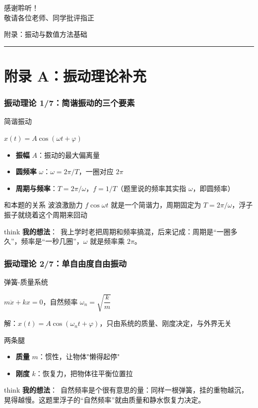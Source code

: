 \documentclass[aspectratio=169]{beamer}
\newcommand{\remark}[2]{%
	\vspace{0.12cm}%
	\begin{beamercolorbox}[rounded=true,sep=6pt]{think}%
		{\color{orchidpurple}\textbf{#1}：}~#2%
	\end{beamercolorbox}%
}
\begin{document}
\begin{frame}
	\centering
	\Huge{感谢聆听！}\\[1cm]
	\Large{敬请各位老师、同学批评指正}
\end{frame}

\appendix

\begin{frame}
	\centering
	\vspace{1.5cm}
	{\color{orchiddark}附录：振动与数值方法基础}\\
	\vspace{0.5cm}
	{\color{orchidpurple}\rule{0.35\textwidth}{1.2pt}}
\end{frame}

\section*{附录 A：振动理论补充}
\begin{frame}
	\frametitle{振动理论 1/7：简谐振动的三个要素}
	\scriptsize
	\begin{block}{简谐振动}
		\begin{center}
			$x(t)=A\cos(\omega t+\varphi)$
		\end{center}
		\begin{itemize}
			\item \textbf{振幅} $A$：振动的最大偏离量
			\item \textbf{圆频率} $\omega$：$\omega=2\pi/T$，一圈对应 $2\pi$
			\item \textbf{周期与频率}：$T=2\pi/\omega$，$f=1/T$（题里说的频率其实指 $\omega$，即圆频率）
		\end{itemize}
	\end{block}
	\begin{block}{和本题的关系}
		波浪激励力 $f\cos\omega t$ 就是一个简谐力，周期固定为 $T=2\pi/\omega$，浮子振子就绕着这个周期来回动
	\end{block}
	\remark{我的想法}{我上学时老把周期和频率搞混，后来记成：周期是``一圈多久''，频率是``一秒几圈''，$\omega$ 就是频率乘 $2\pi$。}
\end{frame}

\begin{frame}
	\frametitle{振动理论 2/7：单自由度自由振动}
	\scriptsize
	\begin{block}{弹簧-质量系统}
		\begin{center}
			$m\ddot x + kx = 0$，自然频率 $\omega_n=\sqrt{\dfrac{k}{m}}$
		\end{center}
		解：$x(t)=A\cos(\omega_n t+\varphi)$，只由系统的质量、刚度决定，与外界无关
	\end{block}
	\begin{block}{两条腿}
		\begin{itemize}
			\item \textbf{质量} $m$：惯性，让物体"懒得起停"
			\item \textbf{刚度} $k$：恢复力，把物体往平衡位置拉
		\end{itemize}
	\end{block}
	\remark{我的想法}{自然频率是个很有意思的量：同样一根弹簧，挂的重物越沉，晃得越慢。这题里浮子的``自然频率''就由质量和静水恢复力决定。}
\end{frame}
\end{document}
